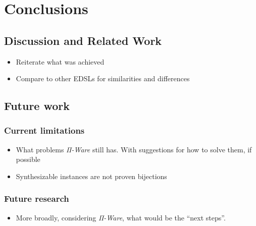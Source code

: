 \chapter{Conclusions}
\label{chap:conclusions}

    \section{Discussion and Related Work}
    \label{sec:related-work}
        \begin{itemize}
            \item Reiterate what was achieved
            \item Compare to other \acp{EDSL} for similarities and differences
        \end{itemize}


    \section{Future work}
    \label{sec:future-work}

        \subsection{Current limitations}
        \label{subsec:current-limitations}
            \begin{itemize}
                \item What problems \emph{Π-Ware} still has.
                    \subitem With suggestions for how to solve them, if possible
                \item Synthesizable instances are not proven bijections
            \end{itemize}

        \subsection{Future research}
        \label{subsec:future-research}
            \begin{itemize}
                \item More broadly, considering \emph{Π-Ware}, what would be the ``next steps''.
            \end{itemize}

